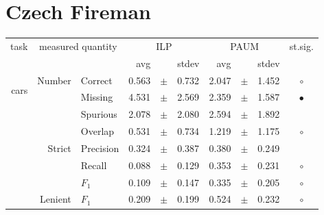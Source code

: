 

\section{Czech Fireman} \label{sec:complete_eval_fire}

\begin{longtable}{|r|r|l||rcl|rcl|c|}
\hline
\multirow{2}{*}{task} & \multicolumn{2}{|c||}{\multirow{2}{*}{measured quantity}} & \multicolumn{3}{|c|}{ILP} & \multicolumn{3}{|c|}{PAUM} & \multirow{2}{*}{st.sig.}\\
\cline{4-9}
  & \multicolumn{2}{|c||}{} &  avg  &    &  stdev  &  avg  &    &  stdev  & \\
\hline
\endhead
\hline
\hline
\multirow{11}{*}{\begin{sideways}cars\end{sideways} }
             & \multirow{4}{*}{    Number} &         Correct &       0.563 &  $\pm$  &       0.732 &       2.047 &  $\pm$  &       1.452 & $\circ$ \\
\cline{3-10} &                             &         Missing &       4.531 &  $\pm$  &       2.569 &       2.359 &  $\pm$  &       1.587 & $\bullet$ \\
\cline{3-10} &                             &        Spurious &       2.078 &  $\pm$  &       2.080 &       2.594 &  $\pm$  &       1.892 &  \\
\cline{3-10} &                             &         Overlap &       0.531 &  $\pm$  &       0.734 &       1.219 &  $\pm$  &       1.175 & $\circ$ \\
\cline{2-10} & \multirow{3}{*}{    Strict} &       Precision &       0.324 &  $\pm$  &       0.387 &       0.380 &  $\pm$  &       0.249 &  \\
\cline{3-10} &                             &          Recall &       0.088 &  $\pm$  &       0.129 &       0.353 &  $\pm$  &       0.231 & $\circ$ \\
\cline{3-10} &                             &           $F_1$ &       0.109 &  $\pm$  &       0.147 &       0.335 &  $\pm$  &       0.205 & $\circ$ \\
\cline{2-10} &                     Lenient &           $F_1$ &       0.209 &  $\pm$  &       0.199 &       0.524 &  $\pm$  &       0.232 & $\circ$ \\

\end{longtable}
